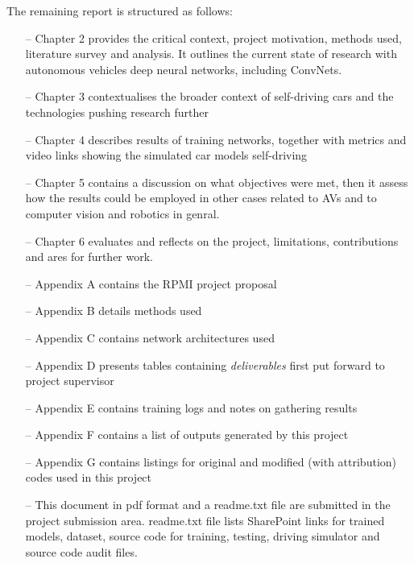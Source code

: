 The remaining report is structured as follows:
\begin{itemize}
    \item[--] Chapter 2 provides the critical context, project motivation, methods used, literature survey and analysis. It outlines the current state of research with autonomous vehicles deep neural networks, including ConvNets.
    \item[--] Chapter 3 contextualises the broader context of self-driving cars and the technologies pushing research further
    \item[--] Chapter 4 describes results of training networks, together with metrics and video links showing the simulated car models self-driving
    \item[--] Chapter 5 contains a discussion on what objectives were met, then it assess how the results could be employed in other cases related to AVs and to computer vision and robotics in genral.
    \item[--] Chapter 6 evaluates and reflects on the project, limitations, contributions and ares for further work.
    \item[--] Appendix A contains the RPMI project proposal
    \item[--] Appendix B details methods used 
    \item[--] Appendix C contains network architectures used
    \item[--] Appendix D presents tables containing \textit{deliverables} first put forward to project supervisor
    \item[--] Appendix E contains training logs and notes on gathering results
    \item[--] Appendix F contains a list of outputs generated by this project
    \item[--] Appendix G contains listings for original and modified (with attribution) codes used in this project
    \item[--] This document in pdf format and a readme.txt file are submitted in the project submission area. readme.txt file lists SharePoint links for trained models, dataset, source code for training, testing, driving simulator and source code audit files.
\end{itemize}
